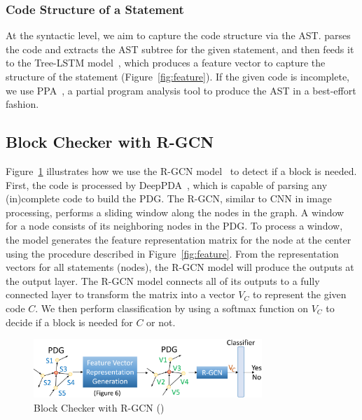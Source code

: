 \vspace{-1pt}
\subsubsection{Code Structure of a Statement}

At the syntactic level, we aim to capture the code structure via the
AST. {\tool} parses the code and extracts the AST subtree for the
given statement, and then feeds it to the Tree-LSTM
model~\cite{tai2015improved}, which produces a feature vector to
capture the structure of the statement (Figure~\ref{fig:feature}). If
the given code is incomplete, we use PPA~\cite{dagenais-oopsla08}, a
partial program analysis tool to produce the AST in a best-effort
fashion.


\subsection{ Block Checker with R-GCN}
\label{model:sec}



Figure~\ref{fig:gcn} illustrates how we use the R-GCN model~\cite{yi} to
detect if a  block is needed.
First, the code is processed by DeepPDA~\cite{icse23}, which is
capable of parsing any (in)complete code to build the PDG. The
R-GCN, similar to CNN in image processing, performs a sliding
window along the nodes in the graph. A window for a node consists of
its neighboring nodes in the PDG.
To process a window, the model generates the feature representation
matrix for the node at the center using the procedure described in
Figure~\ref{fig:feature}.
From the representation vectors for all statements (nodes), the R-GCN
model will produce the outputs at the output layer. The R-GCN model
connects all of its outputs to a fully connected layer to transform
the matrix into a vector $V_C$ to represent the given code $C$. We
then perform classification by using a softmax function on $V_C$ to
decide if a  block is needed for $C$ or not.

\begin{figure}[t]
	\centering
	\includegraphics[width=3.4in]{xblock.png}
	\caption{ Block Checker with R-GCN ({\xblock})}
	\label{fig:gcn}	
\end{figure}


